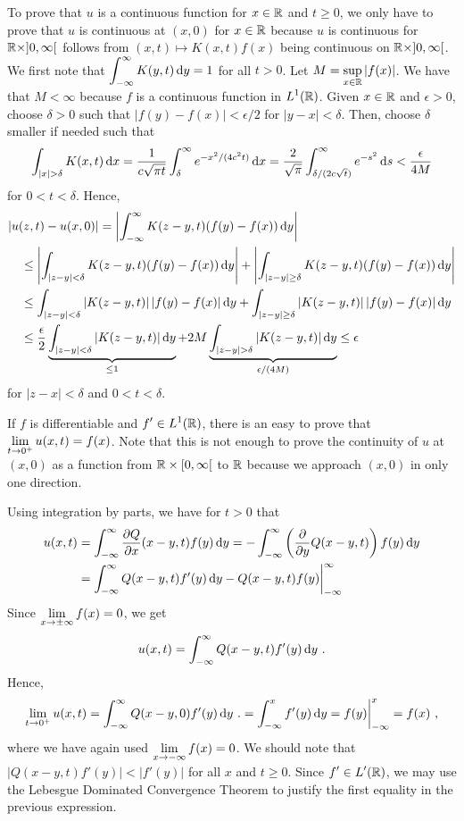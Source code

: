 To prove that $u$ is a continuous function for $x\in \RR$ and $t\geq 0$,
we only have to prove that $u$ is continuous at $(x,0)$ for $x \in \RR$
because $u$ is continuous for $\RR \times ]0,\infty[$ follows from
$(x,t) \mapsto K(x,t)f(x)$ being continuous on $\RR \times ]0,\infty[$.
We first note that
$\DS \int_{-\infty}^{\infty} K(y,t) \dx{y} = 1$ for all $t>0$.
Let $\DS M = \sup_{x \in \RR} |f(x)|$.  We have that
$M < \infty$ because $f$ is a continuous function in $\DS L^1(\RR)$.
Given $x \in \RR$ and $\epsilon>0$, choose $\delta > 0$ such that
$|f(y) - f(x)| < \epsilon/2$ for $|y-x|< \delta$.
Then, choose $\delta$ smaller if needed such that
\[
\int_{|x|>\delta} K(x,t) \dx{x}
= \frac{1}{c \sqrt{\pi t}} \int_{\delta}^\infty e^{-x^2/(4c^2t)} \dx{x}
= \frac{2}{\sqrt{\pi}} \int_{\delta/(2c\sqrt{t})}^\infty e^{-s^2} \dx{s}
< \frac{\epsilon}{4M}
\]
for $0<t<\delta$.  Hence,
\begin{align*}
&|u(z,t) - u(x,0)|
= \left| \int_{-\infty}^{\infty} K(z-y,t) (f(y) - f(x)) \dx{y} \right| \\
&\quad \leq \left| \int_{|z-y|<\delta} K(z-y,t) (f(y) - f(x)) \dx{y} \right|
+ \left| \int_{|z-y|\geq \delta} K(z-y,t) (f(y) - f(x)) \dx{y} \right| \\
&\quad \leq \int_{|z-y|<\delta} |K(z-y,t)|\, |f(y) - f(x)| \dx{y} 
+ \int_{|z-y| \geq \delta} |K(z-y,t)|\,|f(y) - f(x)| \dx{y} \\
&\quad \leq \frac{\epsilon}{2}
\underbrace{\int_{|z-y|<\delta} |K(z-y,t)| \dx{y}}_{\leq 1}
+ 2 M \underbrace{\int_{|z-y|>\delta} |K(z-y,t)| \dx{y}}_{\epsilon/(4M)}
\leq \epsilon
\end{align*}
for $|z-x| < \delta$ and $0<t<\delta$.

\begin{rmk}
If $f$ is differentiable and $\DS f' \in L^1(\RR)$, there is
an easy to prove that
$\DS \lim_{t\to 0^+} u(x,t) = f(x)$.  Note that this is not
enough to prove the continuity of $u$ at $(x,0)$ as a function from
$\RR \times [0,\infty[$ to $\RR$ because we approach $(x,0)$ in only
one direction.

Using integration by parts, we have for $t>0$ that
\begin{align*}
u(x,t) &= \int_{-\infty}^{\infty} \pdydx{Q}{x}(x-y,t) f(y) \dx{y}
= -\int_{-\infty}^{\infty} \left(\pdfdx{Q(x-y,t)}{y}\right) f(y) \dx{y} \\
&= \int_{-\infty}^{\infty} Q(x-y,t) f'(y)\dx{y}
- Q(x-y,t) f(y) \bigg|_{-\infty}^{\infty}
\end{align*}
Since $\DS \lim_{x\to \pm\infty}f(x) = 0$, we get
\[
u(x,t) = \int_{-\infty}^{\infty} Q(x-y,t) f'(y)\dx{y} \ .
\]
Hence,
\[
\lim_{t\to 0^+} u(x,t)
= \int_{-\infty}^{\infty} Q(x-y,0) f'(y)\dx{y} \ .
= \int_{-\infty}^x f'(y) \dx{y} = f(y)\bigg|_{-\infty}^x = f(x) \ ,
\]
where we have again used $\DS \lim_{x\to -\infty}f(x) = 0$.
We should note that $|Q(x-y,t) f'(y)| < |f'(y)|$ for all $x$ and
$t\geq 0$.  Since $\DS f' \in L'(\RR)$, we may use the
Lebesgue Dominated Convergence Theorem to justify the first equality
in the previous expression.
\end{rmk}

